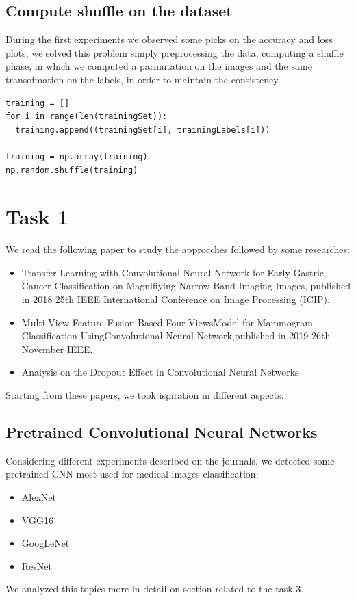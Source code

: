 \documentclass{article}
\begin{document}
\subsection{Compute shuffle on the dataset}
During the first experiments we observed some picks on the accuracy and loss plots, we solved this problem simply preprocessing the data, computing a shuffle phase, in which we computed a parmutation on the images and the same transofmation on the labels, in order to maintain the consistency.

\begin{verbatim}
training = []
for i in range(len(trainingSet)):
  training.append((trainingSet[i], trainingLabels[i]))

training = np.array(training)
np.random.shuffle(training)

\end{verbatim}


\clearpage
\section{Task 1}
We read the following paper to study the approcches followed by some researches:
\begin{itemize}
\item Transfer Learning with Convolutional Neural Network for Early Gastric Cancer Classification on Magnifiying Narrow-Band Imaging Images, published in 2018 25th IEEE International Conference on Image Processing (ICIP).
\item Multi-View Feature Fusion Based Four ViewsModel for Mammogram Classification UsingConvolutional Neural Network,published in 2019 26th November IEEE.
\item Analysis on the Dropout Effect in Convolutional Neural Networks
\end{itemize}
Starting from these papers, we took ispiration in different aspects.

\subsection{Pretrained Convolutional Neural Networks}
Considering different experiments described on the journals, we detected some pretrained CNN most used for medical images classification:
\begin{itemize}
\item AlexNet
\item VGG16
\item GoogLeNet
\item ResNet
\end{itemize}
We analyzed this topics more in detail on section related to the task 3.\\
\end{document}
